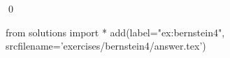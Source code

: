 
\begin{ex} 
  \label{ex:bernstein4}
  
  \qed
\end{ex} 
\begin{python0}
from solutions import *
add(label="ex:bernstein4",
    srcfilename='exercises/bernstein4/answer.tex') 
\end{python0}
